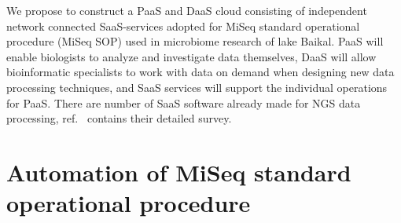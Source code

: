 \documentclass[a4paper]{jpconf}
\begin{document}




We propose to construct a PaaS and DaaS cloud consisting of independent network connected SaaS-services adopted for MiSeq standard operational procedure (MiSeq SOP) used in microbiome research of lake Baikal. PaaS will enable biologists to analyze and investigate data themselves, DaaS will allow bioinformatic specialists to work with data on demand when designing new data processing techniques, and SaaS services will support the individual operations for PaaS. There are number of SaaS software already made for NGS data processing, ref.~\cite{guo16} contains their detailed survey. %


\section{Automation of MiSeq standard operational procedure}
\label{sec:sop}
\end{document}

